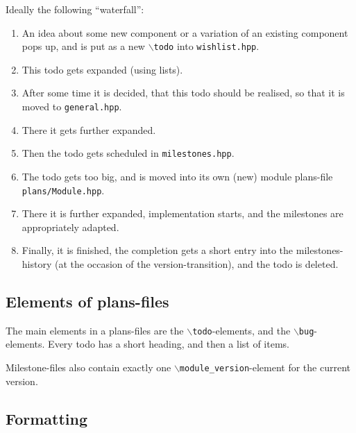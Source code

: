 \documentclass{book}
\newcommand{\filename}[1]{\texttt{#1}}
\begin{document}
Ideally the following ``waterfall'':
\begin{enumerate}
\item An idea about some new component or a variation of an existing component pops up, and is put as a new \texttt{$\backslash$todo} into \filename{wishlist.hpp}.
\item This todo gets expanded (using lists).
\item After some time it is decided, that this todo should be realised, so that it is moved to \filename{general.hpp}.
\item There it gets further expanded.
\item Then the todo gets scheduled in \filename{milestones.hpp}.
\item The todo gets too big, and is moved into its own (new) module plans-file \filename{plans/Module.hpp}.
\item There it is further expanded, implementation starts, and the milestones are appropriately adapted.
\item Finally, it is finished, the completion gets a short entry into the milestones-history (at the occasion of the version-transition), and the todo is deleted.
\end{enumerate}


\subsection{Elements of plans-files}
\label{sec:DoxygenPlansElements}

The main elements in a plans-files are the \texttt{$\backslash$todo}-elements, and the \texttt{$\backslash$bug}-elements. Every todo has a short heading, and then a list of items.

Milestone-files also contain exactly one \texttt{$\backslash$module\_version}-element for the current version.


\subsection{Formatting}
\label{sec:DoxygenPlansFormatting}
\end{document}
